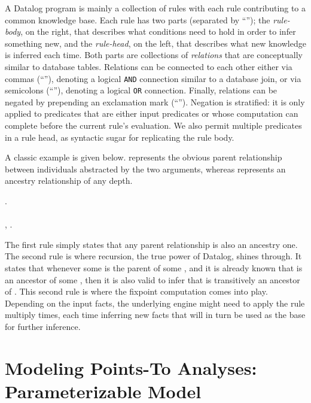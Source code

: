 A Datalog program is mainly a collection of rules with each rule contributing to a common knowledge base. Each rule has two parts (separated by ``\dlIf{}''); the \emph{rule-body}, on the right, that describes what conditions need to hold in order to infer something new, and the \emph{rule-head}, on the left, that describes what new knowledge is inferred each time. Both parts are collections of \emph{relations} that are conceptually similar to database tables. Relations can be connected to each other either via commas (``\code{,}''), denoting a logical \texttt{AND} connection similar to a database join, or via semicolons (``\code{;}''), denoting a logical \texttt{OR} connection. Finally, relations can be negated by prepending an exclamation mark (``\code{!}''). Negation is stratified: it is only applied to predicates that are either input predicates or whose computation can complete before the current rule's evaluation. We also permit multiple predicates in a rule head, as syntactic sugar for replicating the rule body.

A classic example is given below.  represents the obvious parent relationship between individuals abstracted by the two arguments, whereas  represents an ancestry relationship of any depth. 

\begin{datalog}
 \dlIf{} . \\
\\
 \dlIf{} , .
\end{datalog}

The first rule simply states that any parent relationship is also an ancestry one. The second rule is where recursion, the true power of Datalog, shines through. It states that whenever some  is the parent of some , and it is already known that  is an ancestor of some , then it is also valid to infer that  is transitively an ancestor of . This second rule is where the fixpoint computation comes into play. Depending on the input facts, the underlying engine might need to apply the rule multiply times, each time inferring new facts that will in turn be used as the base for further inference.


\section{Modeling Points-To Analyses: Parameterizable Model}
\label{sec:back:model}

